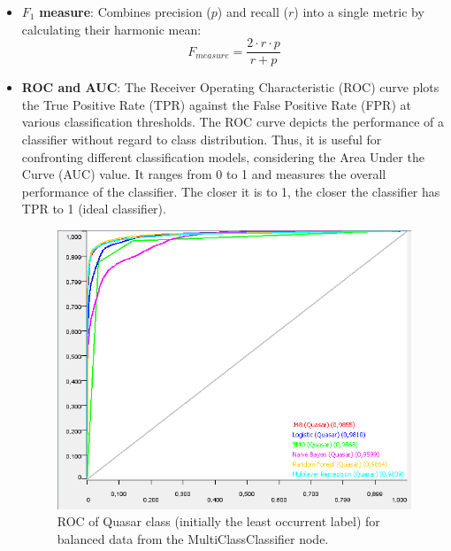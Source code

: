 \begin{itemize}
    \item $F_1$ \textbf{measure}: Combines precision ($p$) and recall ($r$) into a single metric by calculating their harmonic mean:
    \[
    F_{measure} = \frac{2 \cdot r \cdot p}{r + p}
    \]
    \item \textbf{ROC and AUC}: The Receiver Operating Characteristic (ROC) curve plots the True Positive Rate (TPR) against the False Positive Rate (FPR) at various classification thresholds. The ROC curve depicts the performance of a classifier without regard to class distribution. Thus, it is useful for confronting different classification models, considering the Area Under the Curve (AUC) value. It ranges from 0 to 1 and measures the overall performance of the classifier. The closer it is to 1, the closer the classifier has TPR to 1 (ideal classifier).
        \begin{figure}[H]
            \centering
            \includegraphics[width=0.9\columnwidth]{images/ROC Quasar MultiClass KFold.png}
            \caption{ROC of Quasar class (initially the least occurrent label) for balanced data from the MultiClassClassifier node.}
            \label{fig:roc_qso_multiclass_kfold}
        \end{figure}
\end{itemize}